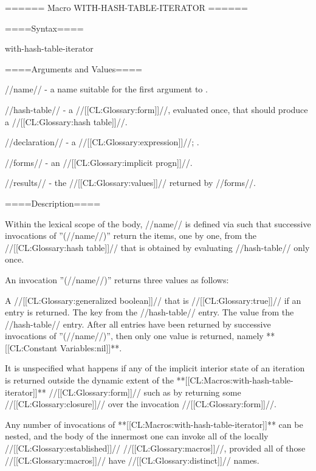 ====== Macro WITH-HASH-TABLE-ITERATOR ======

====Syntax====

\DefmacWithValues with-hash-table-iterator {  } {}

====Arguments and Values====

//name// - a name suitable for the first argument to .

//hash-table// - a //[[CL:Glossary:form]]//, evaluated once, that should produce a //[[CL:Glossary:hash table]]//.

//declaration// - a  //[[CL:Glossary:expression]]//; \noeval.

//forms// - an //[[CL:Glossary:implicit progn]]//.

//results// - the //[[CL:Glossary:values]]// returned by //forms//.

====Description====

Within the lexical scope of the body, //name// is defined via  such that successive invocations of ''(//name//)'' return the items, one by one, from the //[[CL:Glossary:hash table]]// that is obtained by evaluating //hash-table// only once.

An invocation ''(//name//)'' returns three values as follows:

\beginlist

 A //[[CL:Glossary:generalized boolean]]// that is //[[CL:Glossary:true]]// if an entry is returned.  The key from the //hash-table// entry.  The value from the //hash-table// entry. \endlist After all entries have been returned by successive invocations of ''(//name//)'', then only one value is returned, namely **[[CL:Constant Variables:nil]]**.


It is unspecified what happens if any of the implicit interior state of an iteration is returned outside the dynamic extent of the **[[CL:Macros:with-hash-table-iterator]]** //[[CL:Glossary:form]]// such as by returning some //[[CL:Glossary:closure]]// over the invocation //[[CL:Glossary:form]]//.

Any number of invocations of **[[CL:Macros:with-hash-table-iterator]]** can be nested, and the body of the innermost one can invoke all of the locally //[[CL:Glossary:established]]// //[[CL:Glossary:macros]]//, provided all of those //[[CL:Glossary:macros]]// have //[[CL:Glossary:distinct]]// names.

